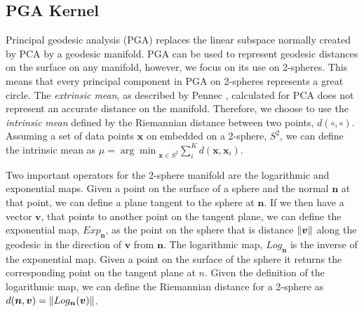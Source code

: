 \subsection{PGA Kernel}\label{subsec:pga-kernel}
Principal geodesic analysis (PGA) \cite{RefWorks:100,RefWorks:86} replaces the linear subspace normally created by PCA by a geodesic manifold. PGA can be used to represent geodesic distances on the surface on any manifold, however, we focus on its use on 2-spheres. This means that every principal component in PGA on 2-spheres represents a great circle. The \textit{extrinsic mean}, as described by Pennec \cite{RefWorks:101}, calculated for PCA does not represent an accurate distance on the manifold. Therefore, we choose to use the \textit{intrinsic mean} defined by the Riemannian distance between two points, $d(\circ,\circ)$. Assuming a set of data points $\boldsymbol{x}$ on embedded on a 2-sphere, $S^2$, we can define the intrinsic mean as $\mu = {\arg\min}_{\boldsymbol{x} \in S^2} \sum_i^K d(\boldsymbol{x}, \boldsymbol{x}_i)$.

Two important operators for the 2-sphere manifold are the logarithmic and exponential maps. Given a point on the surface of a sphere and the normal $\boldsymbol{n}$ at that point, we can define a plane tangent to the sphere at $\boldsymbol{n}$. If we then have a vector $\boldsymbol{v}$, that points to another point on the tangent plane, we can define the exponential map, $Exp_{\boldsymbol{n}}$, as the point on the sphere that is distance $\lVert \boldsymbol{v} \rVert$ along the geodesic in the direction of $\boldsymbol{v}$ from $\boldsymbol{n}$. The logarithmic map, $Log_{\boldsymbol{n}}$ is the inverse of the exponential map. Given a point on the surface of the sphere it returns the corresponding point on the tangent plane at $n$. Given the definition of the logarithmic map, we can define the Riemannian distance for a 2-sphere as $d(\boldsymbol{n}, \boldsymbol{v}) = \lVert Log_{\boldsymbol{n}}(\boldsymbol{v}) \rVert$. 

